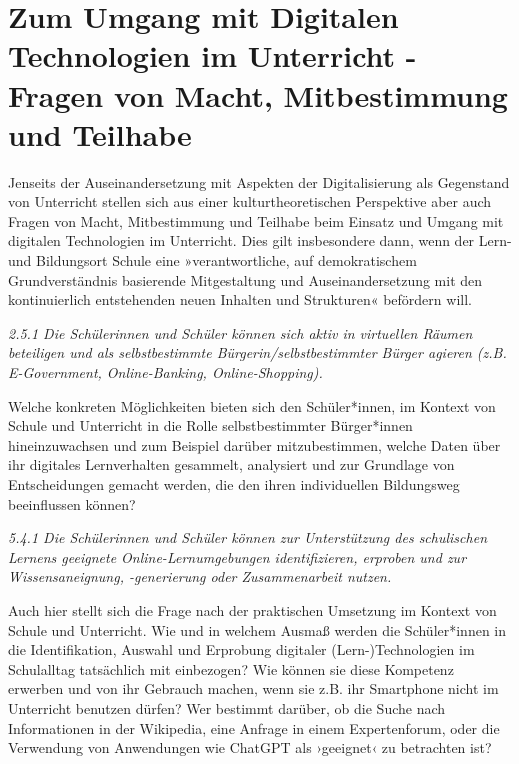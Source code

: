\documentclass[
  a4paper,
]{book}
\begin{document}
\section{Zum Umgang mit Digitalen Technologien im Unterricht - Fragen von Macht, Mitbestimmung und Teilhabe}\label{zum-umgang-mit-digitalen-technologien-im-unterricht---fragen-von-macht-mitbestimmung-und-teilhabe}

Jenseits der Auseinandersetzung mit Aspekten der Digitalisierung als Gegenstand von Unterricht stellen sich aus einer kulturtheoretischen Perspektive aber auch Fragen von Macht, Mitbestimmung und Teilhabe beim Einsatz und Umgang mit digitalen Technologien im Unterricht. Dies gilt insbesondere dann, wenn der Lern- und Bildungsort Schule eine »verantwortliche, auf demokratischem Grundverständnis basierende Mitgestaltung und Auseinandersetzung mit den kontinuierlich entstehenden neuen Inhalten und Strukturen« \citep[S. 4]{ministeriumfurbildungwissenschaftundkulturdeslandesschleswig-holsteinErganzungenFachanforderungenMedienkompetenz2018} befördern will.

{\emph{2.5.1 Die Schülerinnen und Schüler können sich aktiv in virtuellen Räumen beteiligen und als selbstbestimmte Bürgerin/selbstbestimmter Bürger agieren (z.B. E-Government, Online-Banking, Online-Shopping).}}

Welche konkreten Möglichkeiten bieten sich den Schüler*innen, im Kontext von Schule und Unterricht in die Rolle selbstbestimmter Bürger*innen hineinzuwachsen und zum Beispiel darüber mitzubestimmen, welche Daten über ihr digitales Lernverhalten gesammelt, analysiert und zur Grundlage von Entscheidungen gemacht werden, die den ihren individuellen Bildungsweg beeinflussen können?

{\emph{5.4.1 Die Schülerinnen und Schüler können zur Unterstützung des schulischen Lernens geeignete Online-Lernumgebungen identifizieren, erproben und zur Wissensaneignung, -generierung oder Zusammenarbeit nutzen.}}

Auch hier stellt sich die Frage nach der praktischen Umsetzung im Kontext von Schule und Unterricht. Wie und in welchem Ausmaß werden die Schüler*innen in die Identifikation, Auswahl und Erprobung digitaler (Lern-)Technologien im Schulalltag tatsächlich mit einbezogen? Wie können sie diese Kompetenz erwerben und von ihr Gebrauch machen, wenn sie z.B. ihr Smartphone nicht im Unterricht benutzen dürfen? Wer bestimmt darüber, ob die Suche nach Informationen in der Wikipedia, eine Anfrage in einem Expertenforum, oder die Verwendung von Anwendungen wie ChatGPT als ›geeignet‹ zu betrachten ist?
\end{document}
